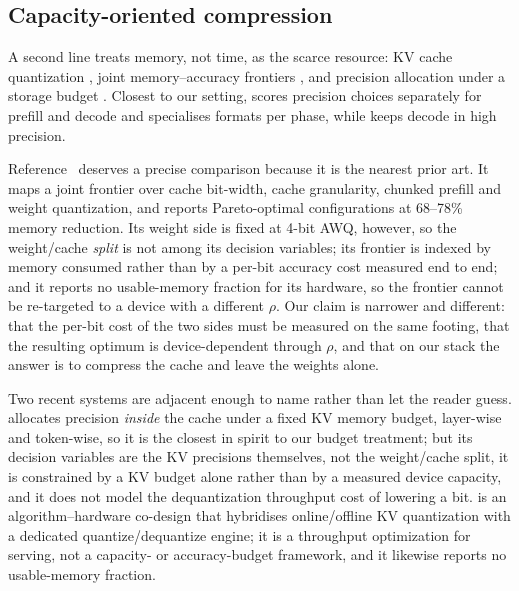 \documentclass[10pt,journal]{IEEEtran}
\newcommand{\rhoSym}{\rho}
\begin{document}
\subsection{Capacity-oriented compression}
A second line treats memory, not time, as the scarce resource: KV cache
quantization \cite{kivi,kvquant,mixkvq}, joint memory--accuracy frontiers
\cite{kvpareto}, and precision allocation under a storage budget
\cite{hawqv2,mixllm,gamma}. Closest to our setting, \cite{alignquant} scores
precision choices separately for prefill and decode and \cite{dq} specialises
formats per phase, while \cite{mixquant} keeps decode in high precision.

Reference~\cite{kvpareto} deserves a precise comparison because it is the nearest prior
art. It maps a joint frontier over cache bit-width, cache granularity, chunked
prefill and weight quantization, and reports Pareto-optimal configurations at
68--78\% memory reduction. Its weight side is fixed at 4-bit AWQ, however, so the
weight/cache \emph{split} is not among its decision variables; its frontier is
indexed by memory consumed rather than by a per-bit accuracy cost measured end to
end; and it reports no usable-memory fraction for its hardware, so the frontier
cannot be re-targeted to a device with a different $\rhoSym$. Our claim is
narrower and different: that the per-bit cost of the two sides must be measured
on the same footing, that the resulting optimum is device-dependent through
$\rhoSym$, and that on our stack the answer is to compress the cache and leave
the weights alone.

Two recent systems are adjacent enough to name rather than let the reader guess.
\cite{multialloc} allocates precision \emph{inside} the cache under a fixed KV
memory budget, layer-wise and token-wise, so it is the closest in spirit to our
budget treatment; but its decision variables are the KV precisions themselves,
not the weight/cache split, it is constrained by a KV budget alone rather than by
a measured device capacity, and it does not model the dequantization throughput
cost of lowering a bit. \cite{oaken} is an algorithm--hardware co-design that
hybridises online/offline KV quantization with a dedicated quantize/dequantize
engine; it is a throughput optimization for serving, not a capacity- or
accuracy-budget framework, and it likewise reports no usable-memory fraction.
\end{document}
